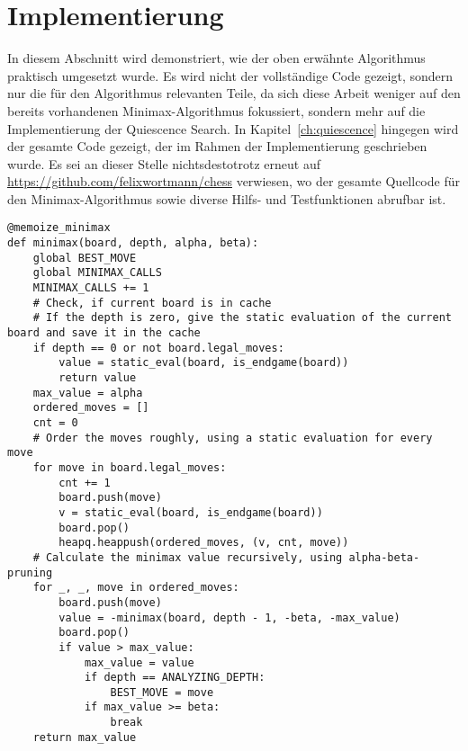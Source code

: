 \section{Implementierung}
In diesem Abschnitt wird demonstriert, wie der oben erwähnte Algorithmus praktisch umgesetzt wurde. Es wird nicht der vollständige Code gezeigt, sondern nur die für den Algorithmus relevanten Teile, da sich diese Arbeit weniger auf den bereits vorhandenen Minimax-Algorithmus fokussiert, sondern mehr auf die Implementierung der Quiescence Search. In Kapitel~\ref{ch:quiescence} hingegen wird der gesamte Code gezeigt, der im Rahmen der Implementierung geschrieben wurde. Es sei an dieser Stelle nichtsdestotrotz erneut auf \url{https://github.com/felixwortmann/chess} verwiesen, wo der gesamte Quellcode für den Minimax-Algorithmus sowie diverse Hilfs- und Testfunktionen abrufbar ist.

\begin{lstlisting}[caption=Code-Beispiel, label=Bsp.1]
    @memoize_minimax
def minimax(board, depth, alpha, beta):
    global BEST_MOVE
    global MINIMAX_CALLS
    MINIMAX_CALLS += 1
    # Check, if current board is in cache
    # If the depth is zero, give the static evaluation of the current board and save it in the cache
    if depth == 0 or not board.legal_moves:
        value = static_eval(board, is_endgame(board))
        return value
    max_value = alpha
    ordered_moves = []
    cnt = 0
    # Order the moves roughly, using a static evaluation for every move
    for move in board.legal_moves:
        cnt += 1
        board.push(move)
        v = static_eval(board, is_endgame(board))
        board.pop()
        heapq.heappush(ordered_moves, (v, cnt, move))
    # Calculate the minimax value recursively, using alpha-beta-pruning
    for _, _, move in ordered_moves:
        board.push(move)
        value = -minimax(board, depth - 1, -beta, -max_value)
        board.pop()
        if value > max_value:
            max_value = value
            if depth == ANALYZING_DEPTH:
                BEST_MOVE = move
            if max_value >= beta:
                break
    return max_value
\end{lstlisting}
